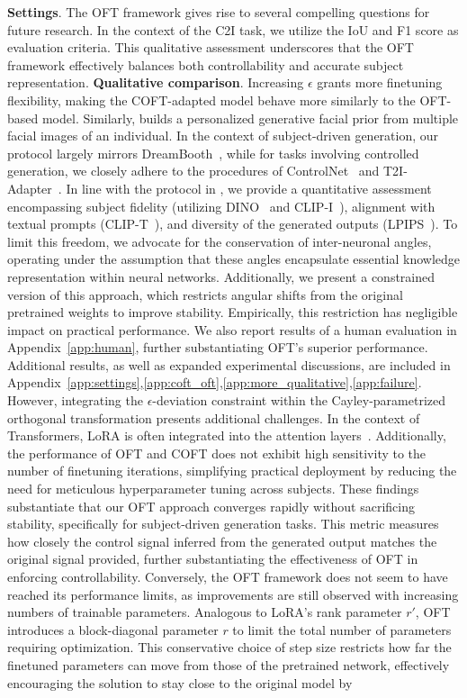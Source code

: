 \textbf{Settings}. The OFT framework gives rise to several compelling questions for future research. In the context of the C2I task, we utilize the IoU and F1 score as evaluation criteria. This qualitative assessment underscores that the OFT framework effectively balances both controllability and accurate subject representation. \textbf{Qualitative comparison}. Increasing $\epsilon$ grants more finetuning flexibility, making the COFT-adapted model behave more similarly to the OFT-based model. Similarly, \cite{nitzan2022mystyle} builds a personalized generative facial prior from multiple facial images of an individual. In the context of subject-driven generation, our protocol largely mirrors DreamBooth~\cite{ruiz2023dreambooth}, while for tasks involving controlled generation, we closely adhere to the procedures of ControlNet~\cite{zhang2023adding} and T2I-Adapter~\cite{mou2023t2i}. In line with the protocol in \cite{ruiz2023dreambooth}, we provide a quantitative assessment encompassing subject fidelity (utilizing DINO~\cite{caron2021emerging} and CLIP-I~\cite{radford2021learning}), alignment with textual prompts (CLIP-T~\cite{radford2021learning}), and diversity of the generated outputs (LPIPS~\cite{zhang2018unreasonable}). To limit this freedom, we advocate for the conservation of inter-neuronal angles, operating under the assumption that these angles encapsulate essential knowledge representation within neural networks. Additionally, we present a constrained version of this approach, which restricts angular shifts from the original pretrained weights to improve stability. Empirically, this restriction has negligible impact on practical performance. We also report results of a human evaluation in Appendix~\ref{app:human}, further substantiating OFT’s superior performance. Additional results, as well as expanded experimental discussions, are included in Appendix~\ref{app:settings},\ref{app:coft_oft},\ref{app:more_qualitative},\ref{app:failure}. However, integrating the $\epsilon$-deviation constraint within the Cayley-parametrized orthogonal transformation presents additional challenges. In the context of Transformers, LoRA is often integrated into the attention layers~\cite{hulora2022}. Additionally, the performance of OFT and COFT does not exhibit high sensitivity to the number of finetuning iterations, simplifying practical deployment by reducing the need for meticulous hyperparameter tuning across subjects. These findings substantiate that our OFT approach converges rapidly without sacrificing stability, specifically for subject-driven generation tasks. This metric measures how closely the control signal inferred from the generated output matches the original signal provided, further substantiating the effectiveness of OFT in enforcing controllability. Conversely, the OFT framework does not seem to have reached its performance limits, as improvements are still observed with increasing numbers of trainable parameters. Analogous to LoRA’s rank parameter $r'$, OFT introduces a block-diagonal parameter $r$ to limit the total number of parameters requiring optimization. This conservative choice of step size restricts how far the finetuned parameters can move from those of the pretrained network, effectively encouraging the solution to stay close to the original model by 